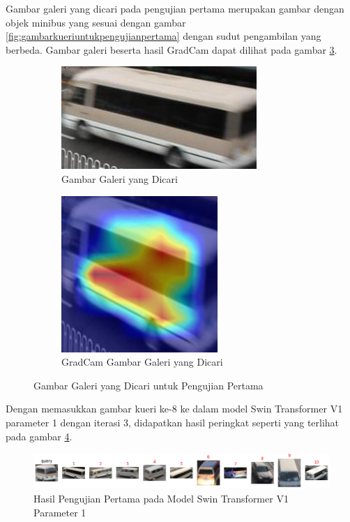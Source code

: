Gambar galeri yang dicari pada pengujian pertama merupakan gambar dengan objek \linebreak minibus yang sesuai dengan gambar 
\ref{fig:gambarkueriuntukpengujianpertama} dengan sudut pengambilan yang berbeda. Gambar galeri beserta hasil GradCam dapat 
dilihat pada gambar \ref{fig:gambargaleriuntukpengujianpertama}.

\begin{figure}[h!]
  \centering
  \begin{subfigure}{.5\textwidth}
    \centering
    \includegraphics[width=.4\linewidth]{gambar/Gal8_1018.jpg}
    \caption{Gambar Galeri yang Dicari}
    \label{gambargalerinomordelapan}
  \end{subfigure}%
  \begin{subfigure}{.5\textwidth}
    \centering
    \includegraphics[width=.4\linewidth]{gambar/GradCamGal8_1018.jpg}
    \caption{GradCam Gambar Galeri yang Dicari}
    \label{gradcamgambargalerinomordelapan}
  \end{subfigure}
  \caption{Gambar Galeri yang Dicari untuk Pengujian Pertama}
  \label{fig:gambargaleriuntukpengujianpertama}
\end{figure}

Dengan memasukkan gambar kueri ke-8 ke dalam model Swin Transformer V1 parameter 1 dengan iterasi 3, didapatkan hasil 
peringkat seperti yang terlihat pada gambar \ref{fig:hasilpengujianpertamapadamodelswintransformerv1param1}.

\begin{figure}[h!]
  \centering
  \includegraphics[scale=0.6]{gambar/Que8V1P1IT3.png}
  \caption{Hasil Pengujian Pertama pada Model Swin Transformer V1 Parameter 1}
  \label{fig:hasilpengujianpertamapadamodelswintransformerv1param1}
\end{figure}

